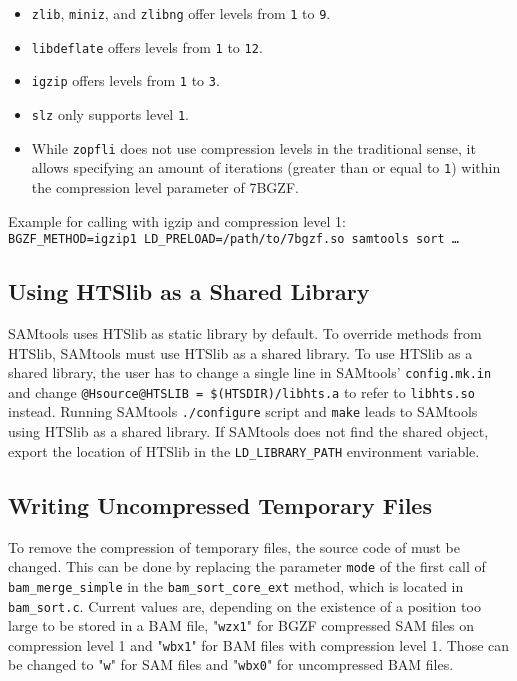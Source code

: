 \begin{itemize}
\itemsep 0mm
    \item {\texttt{zlib}}, {\texttt{miniz}}, and {\texttt{zlibng}} offer levels from \texttt{1} to \texttt{9}.
    \item {\texttt{libdeflate}} offers levels from \texttt{1} to \texttt{12}.
    \item {\texttt{igzip}} offers levels from \texttt{1} to \texttt{3}.
    \item {\texttt{slz}} only supports level \texttt{1}.
    \item While {\texttt{zopfli}} does not use compression levels in the traditional sense, it allows specifying an amount of iterations (greater than or equal to \texttt{1}) within the compression level parameter of 7BGZF.
\end{itemize}

Example for calling \sort with igzip and compression level 1: \\
\texttt{BGZF\_METHOD=igzip1 LD\_PRELOAD=/path/to/7bgzf.so samtools sort …}

\subsection{Using HTSlib as a Shared Library}\label{shared}

SAMtools uses HTSlib as static library by default. To override methods from HTSlib, SAMtools must use HTSlib as a shared library.
To use HTSlib as a shared library, the user has to change a single line in SAMtools' \texttt{config.mk.in} and change \texttt{@Hsource@HTSLIB = \$(HTSDIR)/libhts.a} to refer to \texttt{libhts.so} instead. Running SAMtools \texttt{./configure} script and \texttt{make} leads to SAMtools using HTSlib as a shared library. If SAMtools does not find the shared object, export the location of HTSlib in the \texttt{LD\_LIBRARY\_PATH} environment variable.


\subsection{Writing Uncompressed Temporary Files}\label{changeSource}

To remove the compression of temporary files, the source code of \sort must be changed.  
This can be done by replacing the parameter \texttt{mode} of the first call of \texttt{bam\_merge\_simple} in the \texttt{bam\_sort\_core\_ext} method, which is located in \texttt{bam\_sort.c}. Current values are, depending on the existence of a position too large to be stored in a BAM file, "\texttt{wzx1}" for BGZF compressed SAM files on compression level 1 and "\texttt{wbx1}" for BAM files with compression level 1. Those can be changed to "\texttt{w}" for SAM files and "\texttt{wbx0}" for uncompressed BAM files.

